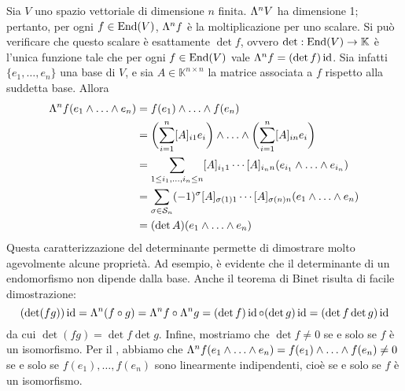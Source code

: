 \begin{example}
Sia $V$ uno spazio vettoriale di dimensione $n$ finita. $\Lambda^nV$ ha dimensione 1; pertanto, per ogni $f\in\operatorname{End}(V)$, $\Lambda^nf$ è la moltiplicazione per uno scalare. Si può verificare che questo scalare è esattamente $\det f$, ovvero $\det:\operatorname{End}(V)\to\mathbb{K}$ è l'unica funzione tale che per ogni $f\in\operatorname{End}(V)$ vale $\Lambda^nf=(\det f)\operatorname{id}$. Sia infatti $\{e_1,\ldots,e_n\}$ una base di $V$, e sia $A\in\mathbb{K}^{n\times n}$ la matrice associata a $f$ rispetto alla suddetta base. Allora
\begin{align*}
\Lambda^nf(e_1\wedge\ldots\wedge e_n)&=f(e_1)\wedge\ldots\wedge f(e_n)\\
&=\biggl(\sum_{i=1}^{n}[A]_{i1}e_i\biggr)\wedge\ldots\wedge\biggl(\sum_{i=1}^{n}[A]_{in}e_i\biggr)\\
&=\sum_{1\le i_1,\ldots,i_n\le n}[A]_{i_11}\cdots[A]_{i_nn}(e_{i_1}\wedge\ldots\wedge e_{i_n})\\
&=\sum_{\sigma\in\mathcal{S}_n}(-1)^\sigma[A]_{\sigma(1)1}\cdots[A]_{\sigma(n)n}(e_1\wedge\ldots\wedge e_n)\\
&=(\det A)(e_1\wedge\ldots\wedge e_n)
\end{align*}
Questa caratterizzazione del determinante permette di dimostrare molto agevolmente alcune proprietà. Ad esempio, è evidente che il determinante di un endomorfismo non dipende dalla base. Anche il teorema di Binet risulta di facile dimostrazione:
$$
(\det(fg))\operatorname{id}=\Lambda^n(f\circ g)=\Lambda^nf\circ\Lambda^ng=(\det f)\operatorname{id}\circ(\det g)\operatorname{id}=(\det f\det g)\operatorname{id}
$$
da cui $\det(fg)=\det f\det g$. Infine, mostriamo che $\det f\neq 0$ se e solo se $f$ è un isomorfismo. Per il , abbiamo che  $\Lambda^nf(e_1\wedge\ldots\wedge e_n)=f(e_1)\wedge\ldots\wedge f(e_n)\neq0$ se e solo se $f(e_1),\ldots,f(e_n)$ sono linearmente indipendenti, cioè se e solo se $f$ è un isomorfismo. 
\end{example}

